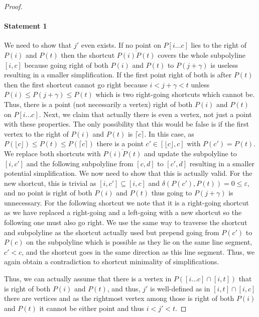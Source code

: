 \begin{proof}
	\paragraph{Statement 1} We need to show that \(j'\) even exists. If no point on \(P[i \dots c]\) lies to the right of \(P(i)\) and \(P(t)\) then the shortcut \(\overline{P(i)P(t)}\) covers the whole subpolyline \([i, c]\) because going right of both \(P(i)\) and \(P(t)\) to \(P(j + \gamma)\) is useless resulting in a smaller simplification. If the first point right of both is after \(P(t)\) then the first shortcut cannot go right because \(i < j + \gamma < t\) unless \(P(i) \leq P(j+\gamma) \leq P(t)\) which is two right-going shortcuts which cannot be. Thus, there is a point (not necessarily a vertex) right of both \(P(i)\) and \(P(t)\) on \(P[i \dots c]\). Next, we claim that actually there is even a vertex, not just a point with these properties. The only possibility that this would be false is if the first vertex to the right of \(P(i)\) and \(P(t)\) is \(\lceil{c}\rceil\). In this case, as \(P(\lfloor{c}\rfloor) \leq P(t) \leq P(\lceil{c}\rceil)\) there is a point \(c' \in [\lfloor{c}\rfloor, c]\) with \(P(c') = P(t)\). We replace both shortcuts with \(\overline{P(i)P(t)}\) and update the subpolyline to \([i, c']\) and the following subpolyline from \([c, d]\) to \([c', d]\) resulting in a smaller potential simplification. We now need to show that this is actually valid. For the new shortcut, this is trivial as \([i, c'] \subseteq [i, c]\) and \(\delta(P(c'), P(t)) = 0 \leq \varepsilon\), and no point is right of both \(P(i)\) and \(P(t)\) thus going to \(P(j+\gamma)\) is unnecessary. For the following shortcut we note that it is a right-going shortcut as we have replaced a right-going and a left-going with a new shortcut so the following one must also go right. We use the same way to traverse the shortcut and subpolyline as the shortcut actually used but prepend going from \(P(c')\) to \(P(c)\) on the subpolyline which is possible as they lie on the same line segment, \(c' < c\), and the shortcut goes in the same direction as this line segment. Thus, we again obtain a contradiction to shortcut minimality of simplifications.

	Thus, we can actually assume that there is a vertex in \(P([i \dots c] \cap [i, t])\) that is right of both \(P(i)\) and \(P(t)\), and thus, \(j'\) is well-defined as in \([i, t] \cap [i, c]\) there are vertices and as the rightmost vertex among those is right of both \(P(i)\) and \(P(t)\) it cannot be either point and thus \(i < j' < t\).



\end{proof}
